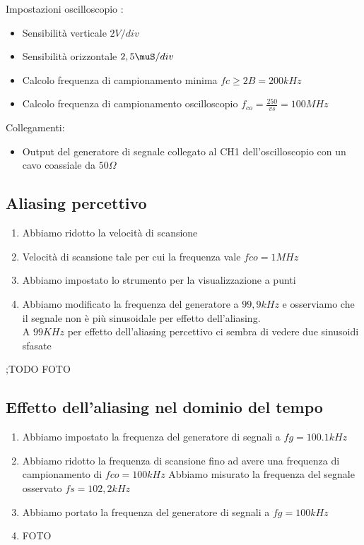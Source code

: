 \documentclass[a4paper]{article}
\begin{document}
Impostazioni oscilloscopio :
\begin{itemize}
\item Sensibilità verticale \(2 V/div\)
\item Sensibilità orizzontale \(2,5 \muS/div \) 
\item Calcolo frequenza di campionamento minima \(fc \geq 2B = 200 kHz\)
\item Calcolo frequenza di campionamento oscilloscopio \(f_{co}=\tfrac{250}{vs}= 100 MHz\)
\end{itemize}

Collegamenti:
\begin{itemize}
\item Output del generatore di segnale collegato al CH1 dell'oscilloscopio con un cavo coassiale da \(50 \Omega\)  
\end{itemize}


\subsection{Aliasing percettivo}
 \begin{enumerate}
  \item Abbiamo ridotto la velocità di scansione
  \item Velocità di scansione tale per cui la frequenza vale \(fco= 1 MHz\)
  \item Abbiamo impostato lo strumento per la visualizzazione a punti
  \item Abbiamo modificato la frequenza del generatore a \(99,9 kHz\) e osserviamo che il segnale non è più sinusoidale per effetto dell'aliasing. \\ A \(99 KHz\) per effetto dell'aliasing percettivo ci sembra di vedere due sinusoidi sfasate 
 \end{enumerate}

;TODO FOTO

\subsection{Effetto dell’aliasing nel dominio del tempo}
 \begin{enumerate}
  \item Abbiamo impostato la frequenza del generatore di segnali a \(fg=100.1 kHz\)
  \item Abbiamo ridotto la frequenza di scansione fino ad avere una frequenza di campionamento di \(fco=100 kHz\) Abbiamo misurato la frequenza del segnale osservato \(fs= 102,2 kHz\)
  \item Abbiamo portato la frequenza del generatore di segnali a \(fg=100kHz\)
  \item FOTO
\end{enumerate}
\end{document}
